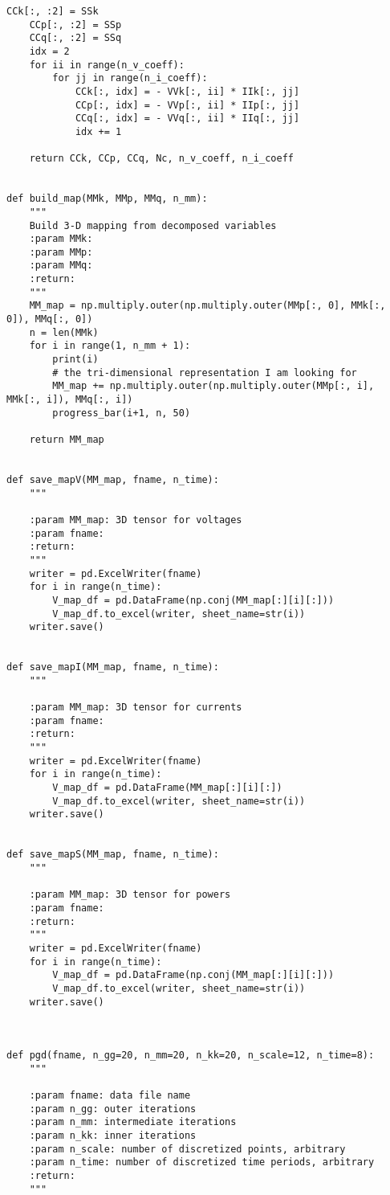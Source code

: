 \begin{lstlisting}[caption={Proper Generalized Decomposition code in Python}]
    CCk[:, :2] = SSk
    CCp[:, :2] = SSp
    CCq[:, :2] = SSq
    idx = 2
    for ii in range(n_v_coeff):
        for jj in range(n_i_coeff):
            CCk[:, idx] = - VVk[:, ii] * IIk[:, jj]
            CCp[:, idx] = - VVp[:, ii] * IIp[:, jj]
            CCq[:, idx] = - VVq[:, ii] * IIq[:, jj]
            idx += 1

    return CCk, CCp, CCq, Nc, n_v_coeff, n_i_coeff


def build_map(MMk, MMp, MMq, n_mm):
    """
    Build 3-D mapping from decomposed variables
    :param MMk:
    :param MMp:
    :param MMq:
    :return:
    """
    MM_map = np.multiply.outer(np.multiply.outer(MMp[:, 0], MMk[:, 0]), MMq[:, 0])
    n = len(MMk)
    for i in range(1, n_mm + 1):
        print(i)
        # the tri-dimensional representation I am looking for
        MM_map += np.multiply.outer(np.multiply.outer(MMp[:, i], MMk[:, i]), MMq[:, i])
        progress_bar(i+1, n, 50)

    return MM_map


def save_mapV(MM_map, fname, n_time):
    """

    :param MM_map: 3D tensor for voltages
    :param fname:
    :return:
    """
    writer = pd.ExcelWriter(fname)
    for i in range(n_time):
        V_map_df = pd.DataFrame(np.conj(MM_map[:][i][:]))
        V_map_df.to_excel(writer, sheet_name=str(i))
    writer.save()


def save_mapI(MM_map, fname, n_time):
    """

    :param MM_map: 3D tensor for currents
    :param fname:
    :return:
    """
    writer = pd.ExcelWriter(fname)
    for i in range(n_time):
        V_map_df = pd.DataFrame(MM_map[:][i][:])
        V_map_df.to_excel(writer, sheet_name=str(i))
    writer.save()


def save_mapS(MM_map, fname, n_time):
    """

    :param MM_map: 3D tensor for powers
    :param fname:
    :return:
    """
    writer = pd.ExcelWriter(fname)
    for i in range(n_time):
        V_map_df = pd.DataFrame(np.conj(MM_map[:][i][:]))
        V_map_df.to_excel(writer, sheet_name=str(i))
    writer.save()



def pgd(fname, n_gg=20, n_mm=20, n_kk=20, n_scale=12, n_time=8):
    """

    :param fname: data file name
    :param n_gg: outer iterations
    :param n_mm: intermediate iterations
    :param n_kk: inner iterations
    :param n_scale: number of discretized points, arbitrary
    :param n_time: number of discretized time periods, arbitrary
    :return:
    """


\end{lstlisting}
